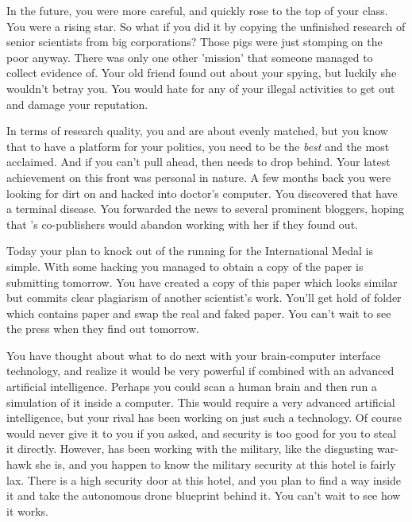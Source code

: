 \documentclass[char]{guildcamp1}
\begin{document}
In the future, you were more careful, and quickly rose to the top of your class. You were a rising star. So what if you did it by copying the unfinished research of senior scientists from big corporations? Those pigs were just stomping on the poor anyway. There was only one other 'mission' that someone managed to collect evidence of.  Your old friend \cBride{} found out about your spying, but luckily she wouldn't betray you.  You would hate for any of your illegal activities to get out and damage your reputation.

In terms of research quality, you and \cScientist{} are about evenly matched, but you know that to have a platform for your politics, you need to be the \emph{best} and the most acclaimed. And if you can't pull ahead, then \cScientist{} needs to drop behind. Your latest achievement on this front was personal in nature. A few months back you were looking for dirt on \cScientist{} and hacked into \cScientist{\Their} doctor's computer. You discovered that \cScientist{\They{}} have a terminal disease. You forwarded the news to several prominent bloggers, hoping that \cScientist{}'s co-publishers would abandon working with her if they found out.

Today your plan to knock \cScientist{} out of the running for the International Medal is simple.  With some hacking you managed to obtain a copy of the paper \cScientist{\they} is submitting tomorrow.  You have created a copy of this paper which looks similar but commits clear plagiarism of another scientist's work.  You'll get hold of \cScientist{\their} folder which contains \cScientist{\their} paper and swap the real and faked paper.  You can't wait to see the press when they find out tomorrow.

You have thought about what to do next with your brain-computer interface technology, and realize it would be very powerful if combined with an advanced artificial intelligence.  Perhaps you could scan a human brain and then run a simulation of it inside a computer.  This would require a very advanced artificial intelligence, but your rival \cScientist{} has been working on just such a technology.  Of course \cScientist{\they} would never give it to you if you asked, and \cScientist{\their} security is too good for you to steal it directly.  However, \cScientist{\they} has been working with the military, like the disgusting war-hawk she is, and you happen to know the military security at this hotel is fairly lax.  There is a high security door at this hotel, and you plan to find a way inside it and take the autonomous drone blueprint behind it.  You can't wait to  see how it works.
\end{document}
